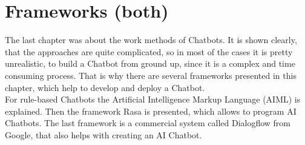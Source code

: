 \documentclass[10pt,final,journal,a4paper,oneside,twocolumn]{IEEEtran}
\begin{document}
\section{Frameworks (both)}\label{sec:frameworks}
The last chapter was about the work methods of Chatbots. It is shown clearly, that the approaches are quite complicated, so in most of the cases it is pretty unrealistic, to build a Chatbot from ground up, since it is a complex and time consuming process. That is why there are several frameworks presented in this chapter, which help to develop and deploy a Chatbot.\\
For rule-based Chatbots the Artificial Intelligence Markup Language (AIML) is explained. Then the framework Rasa is presented, which allows to program AI Chatbots. The last framework is a commercial system called Dialogflow from Google, that also helps with creating an AI Chatbot.
\end{document}
